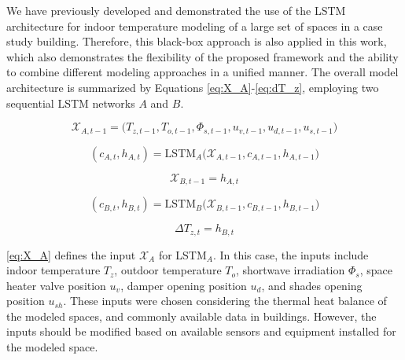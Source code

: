 We have previously developed and demonstrated the use of the LSTM architecture \cite{BSABjoernskov2022, BSOBjoernskov2022} for indoor temperature modeling of a large set of spaces in a case study building. Therefore, this black-box approach is also applied in this work, which also demonstrates the flexibility of the proposed framework and the ability to combine different modeling approaches in a unified manner. The overall model architecture is summarized by Equations \ref{eq:X_A}-\ref{eq:dT_z}, employing two sequential LSTM networks $A$ and $B$.  

\begin{equation}
    \mathcal{X}_{A,t-1} = \big(T_{z,t-1}, T_{o,t-1}, \Phi_{s,t-1}, u_{v,t-1}, u_{d,t-1}, u_{s,t-1}\big)
    \label{eq:X_A}
\end{equation}

\begin{equation}
    (c_{A,t}, h_{A,t}) = \text{LSTM}_A\big( \mathcal{X}_{A,t-1}, c_{A,t-1}, h_{A,t-1} \big)
    \label{eq:LSTM_A}
\end{equation}

\begin{equation}
    \mathcal{X}_{B,t-1} = h_{A,t}
    \label{eq:X_B}
\end{equation}

\begin{equation}
    (c_{B,t}, h_{B,t}) = \text{LSTM}_B\big( \mathcal{X}_{B,t-1}, c_{B,t-1}, h_{B,t-1} \big)
    \label{eq:LSTM_B}
\end{equation}

\begin{equation}
    \Delta T_{z,t} = h_{B,t}
    \label{eq:dT_z}
\end{equation}



\autoref{eq:X_A} defines the input $\mathcal{X}_{A}$ for LSTM$_A$. In this case, the inputs include indoor temperature $T_z$, outdoor temperature $T_o$, shortwave irradiation $\Phi_s$, space heater valve position $u_v$, damper opening position $u_d$, and shades opening position $u_{sh}$. These inputs were chosen considering the thermal heat balance of the modeled spaces, and commonly available data in buildings. However, the inputs should be modified based on available sensors and equipment installed for the modeled space. 

